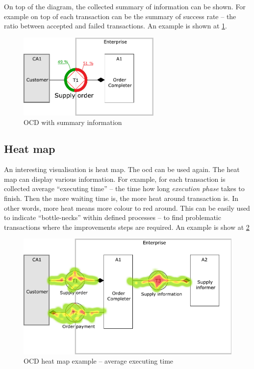 On top of the diagram, the collected summary of information can be shown. For example on top of each transaction can be the summary of success rate -- the ratio between accepted and failed transactions. An example is shown at \cref{fig:ocd-sum}.

\begin{figure}[ht!]
\centering
\includegraphics[width=7cm,keepaspectratio]{img/ocd-sum}
\caption{OCD with summary information}
\label{fig:ocd-sum}
\end{figure}
\subsection{Heat map}
An interesting visualisation is heat map. The \gls{ocd} can be used again. The heat map can display various information. For example, for each transaction is collected average ``executing time'' -- the time how long  \textit{execution phase} takes to finish. Then the more waiting time is, the more heat around transaction is. In other words, more heat means more colour to red around. This can be easily used to indicate ``bottle-necks'' within defined processes -- to find problematic transactions where the improvements steps are required. An example is show at \cref{fig:ocd-heat-map}

\begin{figure}[ht!]
\centering
\includegraphics[width=12cm,keepaspectratio]{img/ocd-heat-map}
\caption{OCD heat map example -- average executing time}
\label{fig:ocd-heat-map}
\end{figure}
